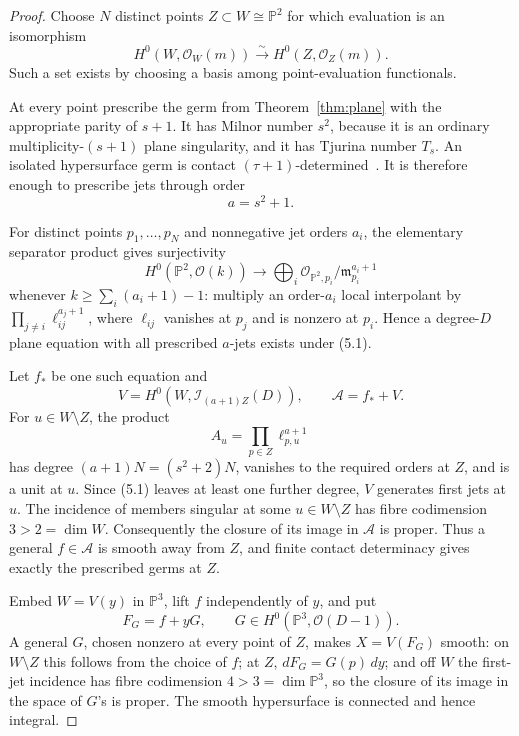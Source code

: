 \documentclass[11pt,a4paper]{article}
\theoremstyle{definition}
\numberwithin{equation}{section}
\newcommand{\PP}{\mathbb P}
\newcommand{\cO}{\mathcal O}
\newcommand{\cI}{\mathcal I}
\newcommand{\m}{\mathfrak m}
\begin{document}
\begin{proof}
Choose \(N\) distinct points \(Z\subset W\cong\PP^2\) for which evaluation
is an isomorphism
\begin{equation}
 H^0(W,\cO_W(m))\xrightarrow{\sim}H^0(Z,\cO_Z(m)).
\end{equation}
Such a set exists by choosing a basis among point-evaluation functionals.

At every point prescribe the germ from Theorem~\ref{thm:plane} with the
appropriate parity of \(s+1\).  It has Milnor number \(s^2\), because it is
an ordinary multiplicity-\((s+1)\) plane singularity, and it has Tjurina
number \(T_s\).  An isolated hypersurface germ is contact
\((\tau+1)\)-determined~\cite[Corollary~2.24]{GLS2007}.  It is therefore
enough to prescribe jets through order
\[
 a=s^2+1.
\]

For distinct points \(p_1,\ldots,p_N\) and nonnegative jet orders \(a_i\),
the elementary separator product gives surjectivity
\[
 H^0(\PP^2,\cO(k))\longrightarrow
 \bigoplus_i\cO_{\PP^2,p_i}/\m_{p_i}^{a_i+1}
\]
whenever \(k\ge\sum_i(a_i+1)-1\): multiply an order-\(a_i\) local
interpolant by
\(\prod_{j\ne i}\ell_{ij}^{a_j+1}\), where \(\ell_{ij}\) vanishes at
\(p_j\) and is nonzero at \(p_i\).  Hence a degree-\(D\) plane equation
with all prescribed \(a\)-jets exists under (5.1).

Let \(f_*\) be one such equation and
\[
 V=H^0(W,\cI_{(a+1)Z}(D)),
 \qquad \mathcal A=f_*+V.
\]
For \(u\in W\setminus Z\), the product
\[
 A_u=\prod_{p\in Z}\ell_{p,u}^{a+1}
\]
has degree \((a+1)N=(s^2+2)N\), vanishes to the required orders at \(Z\),
and is a unit at \(u\).  Since (5.1) leaves at least one further degree,
\(V\) generates first jets at \(u\).  The incidence of members singular at
some \(u\in W\setminus Z\) has fibre codimension \(3>2=\dim W\).
Consequently the closure of its image in \(\mathcal A\) is proper.  Thus a
general \(f\in\mathcal A\) is smooth away from \(Z\), and finite contact
determinacy gives exactly the prescribed germs at \(Z\).

Embed \(W=V(y)\) in \(\PP^3\), lift \(f\) independently of \(y\), and put
\[
 F_G=f+yG,
 \qquad G\in H^0(\PP^3,\cO(D-1)).
\]
A general \(G\), chosen nonzero at every point of \(Z\), makes
\(X=V(F_G)\) smooth: on \(W\setminus Z\) this follows from the choice of
\(f\); at \(Z\), \(dF_G=G(p)\,dy\); and off \(W\) the first-jet incidence
has fibre codimension \(4>3=\dim\PP^3\), so the closure of its image in the
space of \(G\)'s is proper.  The smooth hypersurface is connected and hence
integral.


\end{proof}
\end{document}
